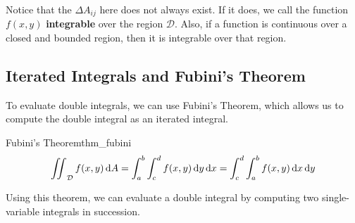 Notice that the $\Delta A_{ij}$ here does not always exist. If it does, we call the function $f(x, y)$ \textbf{integrable} over the region $\mathcal{D}$.
Also, if a function is continuous over a closed and bounded region, then it is integrable over that region.

\subsection{Iterated Integrals and Fubini's Theorem}
To evaluate double integrals, we can use Fubini's Theorem, which allows us to compute the double integral as an iterated integral.
\begin{theorem}{Fubini's Theorem}{thm_fubini}
\[
    \mathop{\int\mkern-10mu\int}\nolimits_{\mathcal{D}} f(x, y) \, \mathrm{d}A = \int_a^b \int_c^d f(x, y) \, \mathrm{d}y \, \mathrm{d}x = \int_c^d \int_a^b f(x, y) \, \mathrm{d}x \, \mathrm{d}y
\]
\end{theorem}

Using this theorem, we can evaluate a double integral by computing two single-variable integrals in succession.

